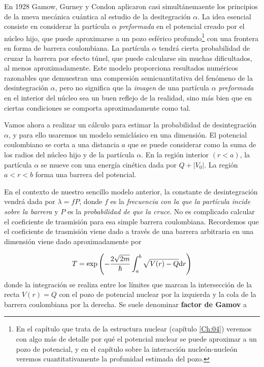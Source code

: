 En 1928 Gamow, Gurney y Condon aplicaron casi simultánemaente los principios de la nueva mecánica cuántica al estudio de la desitegración $\alpha$. La idea esencial consiste en considerar la partícula $\alpha$ \textit{preformada} en el potencial creado por el núcleo hijo, que puede aproximarse a un pozo esférico profundo\footnote{En el capítulo que trata de la estructura nuclear (capítulo \ref{Ch:04}) veremos con algo más de detalle por qué el potencial nuclear se puede aproximar a un pozo de potencial, y en el capítulo sobre la interacción nucleón-nucleón veremos cuantitativamente la profunidad estimada del pozo.} con una frontera en forma de barrera coulombiana. La partícula $\alpha$ tendrá cierta probabilidad de cruzar la barrera por efecto túnel, que puede calcularse sin muchas dificultados, al menos aproximadamente. Este modelo proporciona resultados numéricos razonables que demuestran una compresión semicuantitativa del fenómeno de la desintegración $\alpha$, pero no significa que la \textit{imagen} de una partícula $\alpha$ \textit{preformada} en el interior del núcleo sea un buen reflejo de la realidad, sino más bien que en ciertas condiciones se comporta aproximadamente como tal.

Vamos ahora a realizar un cálculo para estimar la probabilidad de desintegración $\alpha$, y para ello usaremos un modelo semiclásico en una dimensión. El potencial coulombiano se corta a una distancia $a$ que se puede considerar como la suma de los radios del núcleo hijo y de la partícula $\alpha$. En la región interior $(r<a)$, la partícula $\alpha$ se mueve con una energía cinética dada por $Q+|V_0|$. La región $a<r<b$ forma una barrera del potencial. 

En el contexto de nuestro sencillo modelo anterior, la constante de desintegración vendrá dada por $\lambda = fP$, donde $f$ es la \textit{frecuencia con la que la partícula incide sobre la barrera} y $P$ es la \textit{probabilidad de que la cruce}. No es complicado calcular el coeficiente de trasmisión para esa simple barrera coulombiana. Recordemos que el coeficiente de trasmisión viene dado a través de una barrera arbitraria en una dimensión viene dado aproximadamente por

\begin{equation}
    T = \exp \left( -\frac{2\sqrt{2m}}{\hbar } \int_a^b \sqrt{V(r)-Q}\mathrm{d} r \right)
\end{equation}
donde la integración se realiza entre los límites que marcan la intersección de la recta $V(r) = Q$ con el pozo de potencial nuclear por la izquierda y la cola de la barrera coulombiana por la derecha. Se suele denominar \textbf{factor de Gamov} a 


